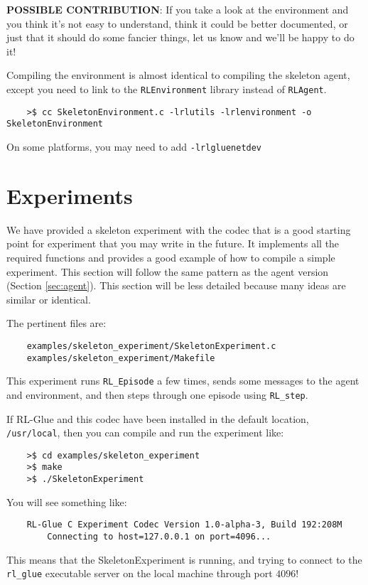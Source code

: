 \documentclass[11pt]{article}
\begin{document}
\textbf{POSSIBLE CONTRIBUTION}: If you take a look at the environment and you think it's not easy to understand, think it could be better documented, 
or just that it should do some fancier things, let us know and we'll be happy to do it!

Compiling the environment is almost identical to compiling the skeleton agent, except you need to link to the \texttt{RLEnvironment} library instead of \texttt{RLAgent}.
\begin{verbatim}
	>$ cc SkeletonEnvironment.c -lrlutils -lrlenvironment -o SkeletonEnvironment
\end{verbatim}

On some platforms, you may need to add \texttt{-lrlgluenetdev}

\section{Experiments}
We have provided a skeleton experiment with the codec that is a good starting point for experiment that you may write in the future.
It implements all the required functions and provides a good example of how to compile a simple experiment.  This section will follow the same 
pattern as the agent version (Section \ref{sec:agent}).  This section will be less detailed because many ideas are similar or identical.

The pertinent files are:
\begin{verbatim}
	examples/skeleton_experiment/SkeletonExperiment.c
	examples/skeleton_experiment/Makefile
\end{verbatim}

This experiment runs \texttt{RL\_Episode} a few times, sends some messages to the agent and environment, and then steps through one episode using \texttt{RL\_step}.

If RL-Glue and this codec have been installed in the default location, \texttt{/usr/local}, then you can compile and run the experiment like:
\begin{verbatim}
	>$ cd examples/skeleton_experiment
	>$ make
	>$ ./SkeletonExperiment
\end{verbatim}

You will see something like:
\begin{verbatim}
	RL-Glue C Experiment Codec Version 1.0-alpha-3, Build 192:208M
		Connecting to host=127.0.0.1 on port=4096...
\end{verbatim}

This means that the SkeletonExperiment is running, and trying to connect to the \texttt{rl\_glue} executable server on the local machine through port $4096$!  
\end{document}

